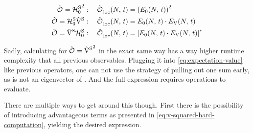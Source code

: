 \begin{equation}
    \label{eq:simple-variance-terms}
    \begin{split}
        \ObservableOp ={\HzeroHamiltonian[\schroedingerPicture]}^2   &: \quad \localObservable{N}{t} =
        \left(E_0(N,\,t)\right)^2
        \\
        \ObservableOp =\HzeroHamiltonian[\schroedingerPicture]\Vhamiltonian[\schroedingerPicture]   &: \quad \localObservable{N}{t} = E_0(N,\,t) \cdot E_\text{V}(N,\,t)
        \\
        \ObservableOp =\Vhamiltonian[\schroedingerPicture]\HzeroHamiltonian[\schroedingerPicture]   &: \quad \localObservable{N}{t} = \left[E_0(N,\,t) \cdot E_\text{V}(N,\,t) \right]^\ast
    \end{split}
\end{equation}

Sadly, calculating  for $\ObservableOp = {\Vhamiltonian[\schroedingerPicture]}^2$ in the exact same way has a way higher runtime complexity that all previous observables.
Plugging it into \autoref{eq:expectation-value} like previous operators, one can not use the strategy of pulling out one sum early, as \ketN[N] is not an eigenvector of \Vhamiltonian[\schroedingerPicture].
And the full expression requires  operations to evaluate. 

There are multiple ways to get around this though. First there is the possibility of introducing advantageous terms as presented in \autoref{eq:v-squared-hard-computation}, yielding the desired expression.


